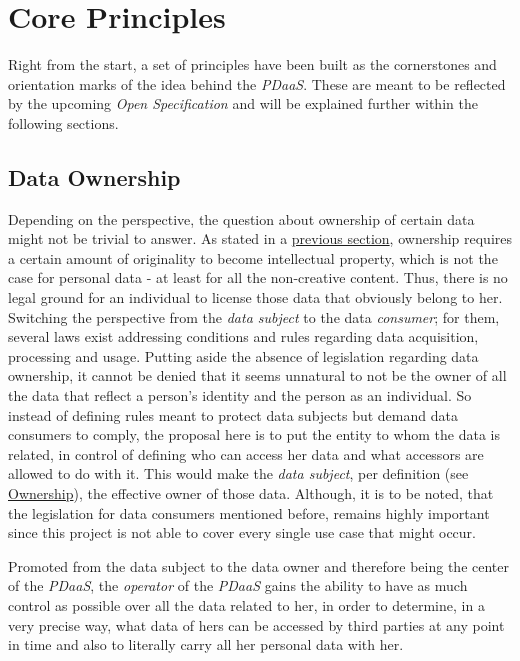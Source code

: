 \documentclass[12pt,english,a4paper,titlepage,cleardoublepage=empty,dottedtoc]{report}
\begin{document}
\hypertarget{core-principles}{\chapter{Core
Principles}\label{core-principles}}

Right from the start, a set of principles have been built as the
cornerstones and orientation marks of the idea behind the \emph{PDaaS}.
These are meant to be reflected by the upcoming \emph{Open
Specification} and will be explained further within the following
sections.

\section{Data Ownership}\label{data-ownership}

Depending on the perspective, the question about ownership of certain
data might not be trivial to answer. As stated in a
\protect\hyperlink{digital-identity-personal-data-and-ownership}{previous
section}, ownership requires a certain amount of originality to become
intellectual property, which is not the case for personal data - at
least for all the non-creative content. Thus, there is no legal ground
for an individual to license those data that obviously belong to her.
Switching the perspective from the \emph{data subject} to the data
\emph{consumer}; for them, several laws exist addressing conditions and
rules regarding data acquisition, processing and usage. Putting aside
the absence of legislation regarding data ownership, it cannot be denied
that it seems unnatural to not be the owner of all the data that reflect
a person's identity and the person as an individual. So instead of
defining rules meant to protect data subjects but demand data consumers
to comply, the proposal here is to put the entity to whom the data is
related, in control of defining who can access her data and what
accessors are allowed to do with it. This would make the \emph{data
subject}, per definition (see
\protect\hyperlink{def-ownership}{Ownership}), the effective owner of
those data. Although, it is to be noted, that the legislation for data
consumers mentioned before, remains highly important since this project
is not able to cover every single use case that might occur.

Promoted from the data subject to the data owner and therefore being the
center of the \emph{PDaaS}, the \emph{operator} of the \emph{PDaaS}
gains the ability to have as much control as possible over all the data
related to her, in order to determine, in a very precise way, what data
of hers can be accessed by third parties at any point in time and also
to literally carry all her personal data with her.
\end{document}
